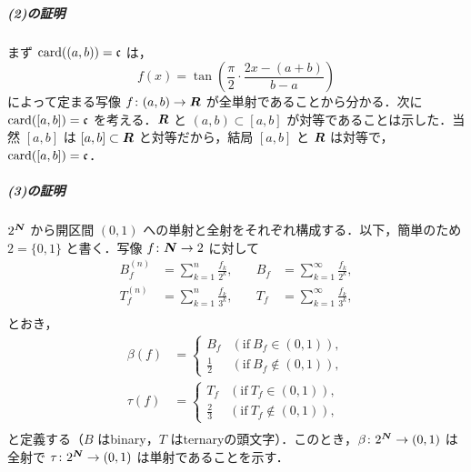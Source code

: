 \documentclass[pandoc,base=10pt,b5j,precisetext]{bxjsarticle}
\let\oldsubparagraph\subparagraph
\renewcommand{\subparagraph}[1]{\oldsubparagraph{#1}\mbox{}}
\begin{document}
\hypertarget{ux306eux8a3cux660e-1}{%
\subparagraph{(2)の証明}\label{ux306eux8a3cux660e-1}}

まず \(\mathop{\mathrm{card}}\nolimits((a, b)) = \mathfrak c\) は， \[
f(x) = \tan\left( \frac \pi2 \cdot \frac{2x - (a + b)}{b - a} \right)
\] によって定まる写像 \(f \colon (a, b) \to \boldsymbol{R}\)
が全単射であることから分かる．次に \(\mathop{\mathrm{card}}\nolimits([a, b]) = \mathfrak c\)
を考える．\(\boldsymbol{R}\) と \((a, b) \subset [a, b]\)
が対等であることは示した．当然 \([a, b]\) は \([a, b] \subset \boldsymbol{R}\)
と対等だから，結局 \([a, b]\) と \(\boldsymbol{R}\)
は対等で，\(\mathop{\mathrm{card}}\nolimits([a, b]) = \mathfrak c\)．

\hypertarget{ux306eux8a3cux660e-2}{%
\subparagraph{(3)の証明}\label{ux306eux8a3cux660e-2}}

\(2^{\boldsymbol{N}}\) から開区間 \((0, 1)\)
への単射と全射をそれぞれ構成する．以下，簡単のため \(2 = \{ 0, 1 \}\)
と書く．写像 \(f \colon \boldsymbol{N} \to 2\) に対して \begin{align*}
B_f^{(n)} &= \sum_{k = 1}^n \frac{f_k}{2^k},&\quad B_f &= \sum_{k = 1}^\infty \frac{f_k}{2^k},\\
T_f^{(n)} &= \sum_{k = 1}^n \frac{f_k}{3^k},&\quad T_f &= \sum_{k = 1}^\infty \frac{f_k}{3^k},\\
\end{align*} とおき， \begin{align*}
\beta(f) &= \left\{ \begin{array}{ll} B_f & (\text{if}\ B_f \in (0, 1)),\\ \frac 12 & (\text{if}\ B_f \notin (0, 1)), \end{array} \right. \\
\tau(f) &= \left\{ \begin{array}{ll} T_f & (\text{if}\ T_f \in (0, 1)),\\ \frac 23 & (\text{if}\ T_f \notin (0, 1)), \end{array} \right. \\
\end{align*} と定義する（\(B\) はbinary，\(T\)
はternaryの頭文字）．このとき，\(\beta \colon 2^{\boldsymbol{N}} \to (0, 1)\)
は全射で \(\tau \colon 2^{\boldsymbol{N}} \to (0, 1)\) は単射であることを示す．
\end{document}
